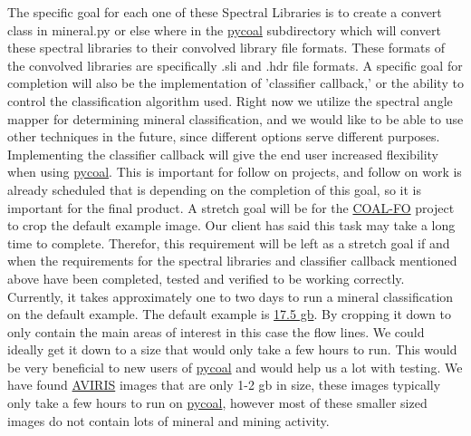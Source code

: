 \documentclass[a4paper,12pt]{article}
\begin{document}
\newline
The specific goal for each one of these Spectral Libraries is to create a convert class in mineral.py or else where in the \href{https://github.com/capstone-coal/pycoal}{pycoal} subdirectory which will convert these spectral libraries to their convolved library file formats. These formats of the convolved libraries are specifically .sli and .hdr file formats.\newline
\newline
A specific goal for completion will also be the implementation of 'classifier callback,' or the ability to control the classification algorithm used. Right now we utilize the spectral angle mapper for determining mineral classification, and we would like to be able to use other techniques in the future, since different options serve different purposes. Implementing the classifier callback will give the end user increased flexibility when using \href{https://github.com/capstone-coal/pycoal}{pycoal}. This is important for follow on projects, and follow on work is already scheduled that is depending on the completion of this goal, so it is important for the final product. \newline
\newline
A stretch goal will be for the \href{https://capstone-coal.github.io/team}{COAL-FO} project to crop the default example image. Our client has said this task may take a long time to complete. Therefor, this requirement will be left as a stretch goal if and when the requirements for the spectral libraries and classifier callback mentioned above have been completed, tested and verified to be working correctly. \newline
\newline
Currently, it takes approximately one to two days to run a mineral classification on the default example. The default example is \href{ftp://avng.jpl.nasa.gov/AVNG_2015_data_distribution/L2/ang20150420t182050_rfl_v1e/}{17.5 gb}. By cropping it down to only contain the main areas of interest in this case the flow lines. We could ideally get it down to a size that would only take a few hours to run. This would be very beneficial to new users of \href{https://github.com/capstone-coal/pycoal}{pycoal} and would help us a lot with testing. We have found \href{https://aviris.jpl.nasa.gov/}{AVIRIS} images that are only 1-2 gb in size, these images typically only take a few hours to run on \href{https://github.com/capstone-coal/pycoal}{pycoal}, however most of these smaller sized images do not contain lots of mineral and mining activity. \newline
\end{document}
